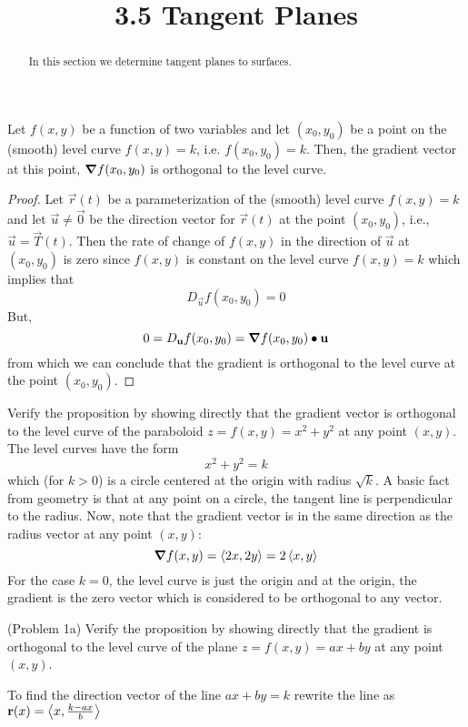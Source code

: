 \documentclass[handout]{ximera}
\title{3.5 Tangent Planes}
\begin{document}
\begin{abstract}
In this section we determine tangent planes to surfaces.
\end{abstract}

\maketitle

\begin{proposition}
Let $f(x,y)$ be a function of two variables and let $(x_0, y_0)$ be a point on the (smooth) level curve $f(x,y) = k$, i.e. $f(x_0, y_0) = k$.
Then, the gradient vector at this point, $\boldsymbol\nabla f(x_0, y_0)$ is orthogonal to the level curve.
\end{proposition}
\begin{proof}
Let $\vec r(t)$ be a parameterization of the (smooth) level curve $f(x,y) = k$ and let $\vec u \neq \vec 0$ be the direction 
vector for $\vec r(t)$ at the point $(x_0, y_0)$, i.e., 
$\vec u = \vec T(t)$. Then the rate of change of $f(x,y)$ in the direction of $\vec u$ at $(x_0, y_0)$ is zero since $f(x,y)$ is 
constant on the level curve $f(x,y) = k$ which implies that
\[
D_{\vec u} f(x_0, y_0) = 0
\]
But,
\[
0 = D_{\mathbf u} f(x_0, y_0)  = \boldsymbol\nabla f(x_0, y_0) \bullet \mathbf u
\]
from which we can conclude that the gradient is orthogonal to the level curve at the point $(x_0, y_0)$.
\end{proof}


\begin{example}[Example 1]
Verify the proposition by showing directly that the gradient vector is orthogonal to the level curve of the paraboloid $z = f(x,y) = x^2 + y^2$ at any point $(x,y)$.\\
The level curves have the form 
\[
x^2 + y^2 = k
\]
which (for $k >0$) is a circle centered at the origin with radius $\sqrt k$. 
A basic fact from geometry is that at any point on a circle, the tangent line is perpendicular to the radius. 
Now, note that the gradient vector is in the same direction as the radius vector at any point $(x, y)$:
\[
\boldsymbol\nabla f(x,y) = \left\langle 2x, 2y\right\rangle = 2\left\langle x,y\right\rangle
\]
For the case $k = 0$, the level curve is just the origin and at the origin, the gradient is the zero vector 
which is considered to be orthogonal to any vector.
\end{example}

\begin{problem}(Problem 1a)
Verify the proposition by showing directly that the gradient is orthogonal to the level curve  of the plane $z = f(x,y) = ax + by$ at any point $(x,y)$.
\begin{hint}
To find the direction vector of the line $ax + by = k$ rewrite the line as $\mathbf r(x) = \left\langle x, \frac{k-ax}{b}\right\rangle$
\end{hint}
\end{problem}
\end{document}
